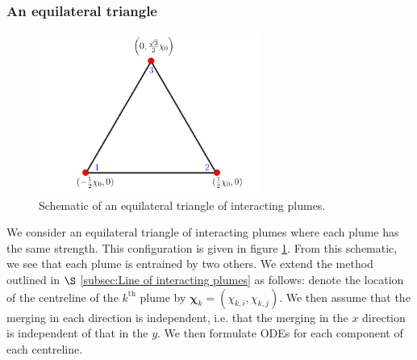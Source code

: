 \documentclass{jfm}
\begin{document}
	\subsubsection{An equilateral triangle}
		\begin{figure}
			\centering
			\includegraphics[width = 0.65\textwidth]{triangularSchematicNI.png}	
			\caption{Schematic of an equilateral triangle of interacting plumes.}
			\label{fig:interacting triangle}
		\end{figure}
	We consider an equilateral triangle of interacting plumes where each plume has the same strength. This configuration is given in figure \ref{fig:interacting triangle}. From this schematic, we see that each plume is entrained by two others. We extend the method outlined in $\S$ \ref{subsec:Line of interacting plumes} as follows: denote the location of the centreline of the $k^{\text{th}}$ plume by $\mathbf{\chi}_k = (\chi_{k,i},\chi_{k,j})$. We then assume that the merging in each direction is independent, i.e. that the merging in the $x$ direction is independent of that in the $y$. We then formulate ODEs for each component of each centreline. \\
	
\end{document}
